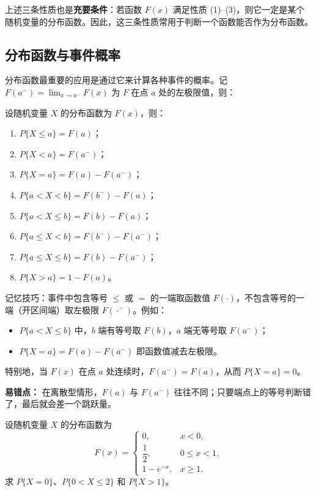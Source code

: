 ﻿\documentclass[lang=cn,11pt]{elegantbook}
\begin{document}
\begin{remark}
上述三条性质也是\textbf{充要条件}：若函数 \(F(x)\) 满足性质 (1)--(3)，则它一定是某个随机变量的分布函数。因此，这三条性质常用于判断一个函数能否作为分布函数。
\end{remark}


\subsection{分布函数与事件概率}

分布函数最重要的应用是通过它来计算各种事件的概率。记 \(F(a^-) = \lim_{x \to a^-} F(x)\) 为 \(F\) 在点 \(a\) 处的左极限值，则：

\begin{property}\label{prop:df-probability}
设随机变量 \(X\) 的分布函数为 \(F(x)\)，则：
\begin{enumerate}
    \item \(P\{X \le a\} = F(a)\)；
    \item \(P\{X < a\} = F(a^-)\)；
    \item \(P\{X = a\} = F(a) - F(a^-)\)；
    \item \(P\{a < X < b\} = F(b^-) - F(a)\)；
    \item \(P\{a < X \le b\} = F(b) - F(a)\)；
    \item \(P\{a \le X < b\} = F(b^-) - F(a^-)\)；
    \item \(P\{a \le X \le b\} = F(b) - F(a^-)\)；
    \item \(P\{X > a\} = 1 - F(a)\)。
\end{enumerate}
\end{property}

\begin{note}
记忆技巧：事件中包含等号 \(\le\) 或 \(=\) 的一端取函数值 \(F(\cdot)\)，不包含等号的一端（开区间端）取左极限 \(F(\cdot^-)\)。例如：
\begin{itemize}
    \item \(P\{a < X \le b\}\) 中，\(b\) 端有等号取 \(F(b)\)，\(a\) 端无等号取 \(F(a^-)\)；
    \item \(P\{X = a\} = F(a) - F(a^-)\) 即函数值减去左极限。
\end{itemize}
特别地，当 \(F(x)\) 在点 \(a\) 处连续时，\(F(a^-) = F(a)\)，从而 \(P\{X = a\} = 0\)。

\textbf{易错点：} 在离散型情形，\(F(a)\) 与 \(F(a^-)\) 往往不同；只要端点上的等号判断错了，最后就会差一个跳跃量。
\end{note}

\begin{exercise}\label{exer:2-1}
设随机变量 \(X\) 的分布函数为
\[
F(x) = \begin{cases}
0, & x < 0, \\
\dfrac{1}{2}, & 0 \le x < 1, \\
1 - e^{-x}, & x \ge 1.
\end{cases}
\]
求 \(P\{X = 0\}\)、\(P\{0 < X \le 2\}\) 和 \(P\{X > 1\}\)。
\end{exercise}
\end{document}
